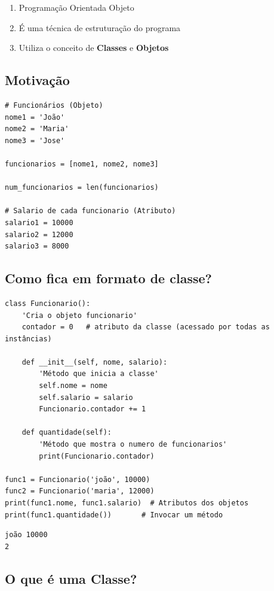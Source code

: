 \documentclass[presentation]{beamer}
\begin{document}
\begin{enumerate}
\item Programação Orientada Objeto
\item É uma técnica de estruturação do programa
\item Utiliza o conceito de \textbf{Classes} e \textbf{Objetos}
\end{enumerate}

\subsection{Motivação}
\label{sec:orgheadline43}

\begin{verbatim}
# Funcionários (Objeto)
nome1 = 'João'
nome2 = 'Maria'
nome3 = 'Jose'

funcionarios = [nome1, nome2, nome3]

num_funcionarios = len(funcionarios)

# Salario de cada funcionario (Atributo)
salario1 = 10000
salario2 = 12000
salario3 = 8000
\end{verbatim}

\subsection{Como fica em formato de classe?}
\label{sec:orgheadline44}

\begin{verbatim}
class Funcionario():
    'Cria o objeto funcionario'
    contador = 0   # atributo da classe (acessado por todas as instâncias)

    def __init__(self, nome, salario):
        'Método que inicia a classe'
        self.nome = nome
        self.salario = salario
        Funcionario.contador += 1 

    def quantidade(self):
        'Método que mostra o numero de funcionarios'
        print(Funcionario.contador)

func1 = Funcionario('joão', 10000)
func2 = Funcionario('maria', 12000)
print(func1.nome, func1.salario)  # Atributos dos objetos
print(func1.quantidade())       # Invocar um método
\end{verbatim}

\begin{verbatim}
joão 10000
2
\end{verbatim}

\subsection{O que é uma \textbf{Classe}?}
\label{sec:orgheadline45}
\end{document}
